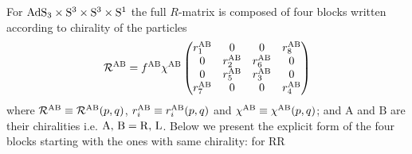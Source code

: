\documentclass[12pt,a4paper]{article}
\numberwithin{equation}{section}
\newcommand{\lR}{\mathcal{R}}
\newcommand{\tA}{\text{A}}
\newcommand{\tB}{\text{B}}
\begin{document}
For  $ {\rm AdS}_{3}\times {\rm S}^3\times {\rm S}^3\times {\rm S}^1 $ \cite{Borsato:2015mma} the full $ R $-matrix is composed of four blocks written according to chirality of the particles
\begin{equation}
\lR^{{\rm AB}}=f^{{\rm AB}}\chi^{{\rm AB}}\begin{pmatrix}
r_1^{{\rm AB}} &    0     &    0      & r_8^{{\rm AB}}\\
0    & r_2^{{\rm AB}} & r_6^{{\rm AB}}  &    0    \\
0    & r_5^{{\rm AB}} & r_3^{{\rm AB}}  &    0    \\
r_7^{{\rm AB}} &    0     &    0      & r_4^{{\rm AB}}
\end{pmatrix}
\label{Rblocks1}
\end{equation}
where $ \lR^{{\rm AB}}\equiv \lR^{{\rm AB}}(p,q) $, $ r_i^{{\rm AB}} \equiv r_i^{{\rm AB}}(p,q)$ and $\chi^{{\rm AB}}\equiv \chi^{{\rm AB}}(p,q) $; and $ \tA$ and $\tB $ are their chiralities i.e. ${\rm A},\,{\rm B}={\rm R},\,{\rm L}  $. Below we present the explicit form of the four blocks starting with the ones with same chirality: for RR
\end{document}
